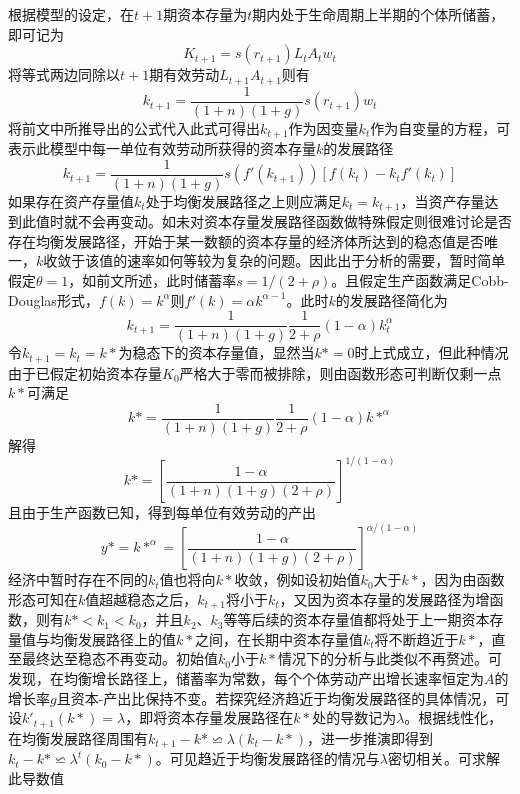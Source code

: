 \documentclass[supercite]{HustGraduPaper}
\begin{document}
    根据模型的设定，在$t+1$期资本存量为$t$期内处于生命周期上半期的个体所储蓄，即可记为
    \begin{equation}
    K_{t+1}=s(r_{t+1})L_tA_tw_t
    \end{equation}
    将等式两边同除以$t+1$期有效劳动$L_{t+1}A_{t+1}$则有
    \begin{equation}
    k_{t+1}=\frac{1}{(1+n)(1+g)}s(r_{t+1})w_t
    \end{equation}
    将前文中所推导出的公式代入此式可得出$k_{t+1}$作为因变量$k_t$作为自变量的方程，可表示此模型中每一单位有效劳动所获得的资本存量$k$的发展路径
    \begin{equation}
    k_{t+1}=\frac{1}{(1+n)(1+g)}s(f'(k_{t+1}))[f(k_t)-k_tf'(k_t)]
    \end{equation}
    如果存在资产存量值$k_t$处于均衡发展路径之上则应满足$k_t=k_{t+1}$，当资产存量达到此值时就不会再变动。如未对资本存量发展路径函数做特殊假定则很难讨论是否存在均衡发展路径，开始于某一数额的资本存量的经济体所达到的稳态值是否唯一，$k$收敛于该值的速率如何等较为复杂的问题。因此出于分析的需要，暂时简单假定$\theta=1$，如前文所述，此时储蓄率$s=1/(2+\rho)$。且假定生产函数满足Cobb-Douglas形式，$f(k)=k^\alpha$则$f'(k)=\alpha k^{\alpha-1}$。此时$k$的发展路径简化为
    \begin{equation}
    k_{t+1}=\frac{1}{(1+n)(1+g)}\frac{1}{2+\rho}(1-\alpha)k_{t}^\alpha
    \end{equation}
    令$k_{t+1}=k_t=k*$为稳态下的资本存量值，显然当$k*=0$时上式成立，但此种情况由于已假定初始资本存量$K_0$严格大于零而被排除，则由函数形态可判断仅剩一点$k*$可满足
    \begin{equation}
    k*=\frac{1}{(1+n)(1+g)}\frac{1}{2+\rho}(1-\alpha)k*^\alpha
    \end{equation}
    解得
    \begin{equation}
    k*=[\frac{1-\alpha}{(1+n)(1+g)(2+\rho)}]^{1/(1-\alpha)}
    \end{equation}
    且由于生产函数已知，得到每单位有效劳动的产出
    \begin{equation}
    y*=k*^\alpha=[\frac{1-\alpha}{(1+n)(1+g)(2+\rho)}]^{\alpha/(1-\alpha)}
    \end{equation}
    经济中暂时存在不同的$k_t$值也将向$k*$收敛，例如设初始值$k_0$大于$k*$，因为由函数形态可知在$k$值超越稳态之后，$k_{t+1}$将小于$k_t$，又因为资本存量的发展路径为增函数，则有$k*<k_1<k_0$，并且$k_2$、$k_3$等等后续的资本存量值都将处于上一期资本存量值与均衡发展路径上的值$k*$之间，在长期中资本存量值$k_t$将不断趋近于$k*$，直至最终达至稳态不再变动。初始值$k_0$小于$k*$情况下的分析与此类似不再赘述。可发现，在均衡增长路径上，储蓄率为常数，每个个体劳动产出增长速率恒定为$A$的增长率$g$且资本-产出比保持不变。若探究经济趋近于均衡发展路径的具体情况，可设$k'_{t+1}(k*)=\lambda$，即将资本存量发展路径在$k*$处的导数记为$\lambda$。根据线性化，在均衡发展路径周围有$k_{t+1}-k*\backsimeq\lambda(k_t-k*)$，进一步推演即得到$k_t-k*\backsimeq\lambda^t(k_0-k*)$。可见趋近于均衡发展路径的情况与$\lambda$密切相关。可求解此导数值
\end{document}
